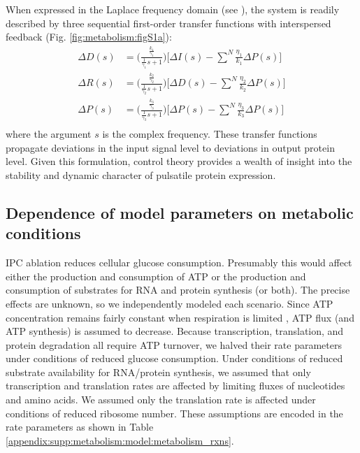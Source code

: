 When expressed in the Laplace frequency domain (see \cite{Seborg2011}), the system is readily described by three sequential first-order transfer functions with interspersed feedback (Fig. \ref{fig:metabolism:figS1a}):
\begin{equation}
\begin{aligned}
\Delta D(s) &= \Big( \frac{\frac{k_1}{\gamma_1}}{\frac{1}{\gamma_1}s+1} \Big) \Big [\Delta I(s) - \sum\limits_{}^{N} \frac{\eta_{1}}{k_1}\Delta P(s) \Big ] \\
\Delta R(s) &= \Big( \frac{\frac{k_2}{\gamma_2}}{\frac{1}{\gamma_2}s+1} \Big) \Big [\Delta D(s) - \sum\limits_{}^{N} \frac{\eta_{2}}{k_2}\Delta P(s) \Big ] \\
\Delta P(s) &= \Big( \frac{\frac{k_3}{\gamma_3}}{\frac{1}{\gamma_3}s+1} \Big) \Big [\Delta P(s) - \sum\limits_{}^{N} \frac{\eta_{3}}{k_3}\Delta P(s) \Big ] \\
\end{aligned}
\end{equation}
where the argument $s$ is the complex frequency. These transfer functions propagate deviations in the input signal level to deviations in output protein level. Given this formulation, control theory provides a wealth of insight into the stability and dynamic character of pulsatile protein expression.

\subsection{Dependence of model parameters on metabolic conditions}
\label{appendix:supp:metabolism:model:metabolism}

IPC ablation reduces cellular glucose consumption. Presumably this would affect either the production and consumption of ATP or the production and consumption of substrates for RNA and protein synthesis (or both). The precise effects are unknown, so we independently modeled each scenario. Since ATP concentration remains fairly constant when respiration is limited \cite{Brown1992}, ATP flux (and ATP synthesis) is assumed to decrease. Because transcription, translation, and protein degradation all require ATP turnover, we halved their rate parameters under conditions of reduced glucose consumption. Under conditions of reduced substrate availability for RNA/protein synthesis, we assumed that only transcription and translation rates are affected by limiting fluxes of nucleotides and amino acids. We assumed only the translation rate is affected under conditions of reduced ribosome number. These assumptions are encoded in the rate parameters as shown in Table \ref{appendix:supp:metabolism:model:metabolism_rxns}.


